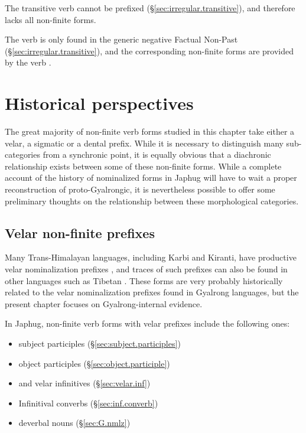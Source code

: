 The transitive verb  cannot be prefixed (§\ref{sec:irregular.transitive}), and therefore lacks all non-finite forms.

The verb  is only found in the generic negative Factual Non-Past (§\ref{sec:irregular.transitive}), and the corresponding non-finite forms are provided by the verb .

\section{Historical perspectives} \label{sec:nmlz.historical.perspectives}
The great majority of non-finite verb forms studied in this chapter take either a velar, a sigmatic or a dental prefix. While it is necessary to distinguish many sub-categories from a synchronic point, it is equally obvious that a diachronic relationship exists between some of these non-finite forms. While a complete account of the history of nominalized forms in Japhug will have to wait a proper reconstruction of proto-Gyalrongic, it is nevertheless possible to offer some preliminary thoughts on the relationship between these morphological categories.

\subsection{Velar non-finite prefixes} \label{sec:velar.nmlz.history}
Many Trans-Himalayan languages, including Karbi and Kiranti, have productive velar nominalization prefixes \citep{konnerth16gV}, and traces of such prefixes can also be found in other languages such as Tibetan \citep{jacques14snom}. These forms are very probably historically related to the velar nominalization prefixes found in Gyalrong languages, but the present chapter focuses on Gyalrong-internal evidence.

In Japhug, non-finite verb forms with velar prefixes include the following ones:

\begin{itemize}
\item {} subject participles (§\ref{sec:subject.participles})
\item {} object participles (§\ref{sec:object.participle})
\item {} and  velar infinitives (§\ref{sec:velar.inf})
\item Infinitival converbs (§\ref{sec:inf.converb})
\item {} deverbal nouns (§\ref{sec:G.nmlz})
\end{itemize}

